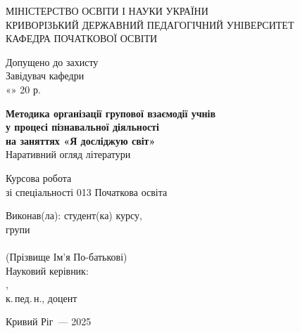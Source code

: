\documentclass[a4paper,14pt]{extarticle}
\begin{document}
\begin{titlepage}
\begin{center}
\MakeUppercase{Міністерство освіти і науки України}\\[0.3em]
\MakeUppercase{Криворізький державний педагогічний університет}\\[0.3em]
\MakeUppercase{Кафедра початкової освіти}

\vspace{1.5cm}
{\small Допущено до захисту}\\
{\small Завідувач кафедри \underline{\hspace{4cm}}}\\
{\small «\underline{\hspace{1cm}}» \underline{\hspace{3cm}} 20\underline{\hspace{0.7cm}} р.}

\vspace{2.5cm}
{\large\bfseries
Методика організації групової взаємодії учнів\\
у процесі пізнавальної діяльності\\
на заняттях «Я досліджую світ»}\\[0.5em]
{\normalsize Наративний огляд літератури}

\vspace{1.5cm}
{\normalsize Курсова робота\\
зі спеціальності 013 Початкова освіта}

\vspace{2cm}
\begin{flushright}
{\normalsize
Виконав(ла): студент(ка) \underline{\hspace{0.5cm}} курсу,\\
групи \underline{\hspace{2cm}}\\
\underline{\hspace{5cm}}\\
(Прізвище Ім'я По-батькові)\\[1em]
Науковий керівник:\\
\underline{\hspace{5cm}},\\
к.\,пед.\,н., доцент
}
\end{flushright}

\vfill
{\normalsize Кривий Ріг~--- 2025}
\end{center}
\end{titlepage}
\end{document}
